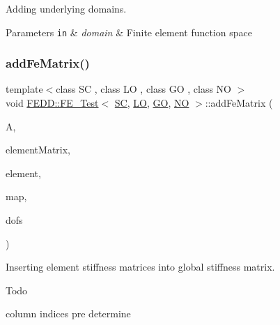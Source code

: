 Adding underlying domains. 


\begin{DoxyParams}[1]{Parameters}
\mbox{\tt in}  & {\em domain} & Finite element function space \\
\hline
\end{DoxyParams}
\mbox{\label{classFEDD_1_1FE__Test_aae827bac5afc6e83398c187fde2dc48c}} 
\subsubsection{\texorpdfstring{add\+Fe\+Matrix()}{addFeMatrix()}}
{\footnotesize\ttfamily template$<$class SC , class LO , class GO , class NO $>$ \\
void \hyperlink{classFEDD_1_1FE__Test}{F\+E\+D\+D\+::\+F\+E\+\_\+\+Test}$<$ \hyperlink{fe__test__laplace_8cpp_a79c7e86a57edbb2a5a53242bcd04e41e}{SC}, \hyperlink{fe__test__laplace_8cpp_ad6a38c9f07d3fd633eefca5bccad8410}{LO}, \hyperlink{fe__test__laplace_8cpp_afa2946b509009b4f45eb04bd8c5b27d9}{GO}, \hyperlink{fe__test__laplace_8cpp_a5e24f37b28787429872b6ecb1d0417ce}{NO} $>$\+::add\+Fe\+Matrix (\begin{DoxyParamCaption}\item[{\hyperlink{classFEDD_1_1FE__Test_a3c2e34afc3a1495c2b00313399f12b3d}{Matrix\+Ptr\+\_\+\+Type} \&}]{A,  }\item[{\hyperlink{classFEDD_1_1FE__Test_a675b52d9e58407c6baadb403394be92b}{Small\+Matrix\+Ptr\+\_\+\+Type}}]{element\+Matrix,  }\item[{Finite\+Element}]{element,  }\item[{\hyperlink{classFEDD_1_1FE__Test_ad09d94cdf8e7574fc9b6d1648fa18826}{Map\+Const\+Ptr\+\_\+\+Type}}]{map,  }\item[{int}]{dofs }\end{DoxyParamCaption})\hspace{0.3cm}{\ttfamily [private]}}



Inserting element stiffness matrices into global stiffness matrix. 

\begin{DoxyRefDesc}{Todo}
\item[\hyperlink{todo__todo000010}{Todo}]column indices pre determine\end{DoxyRefDesc}



